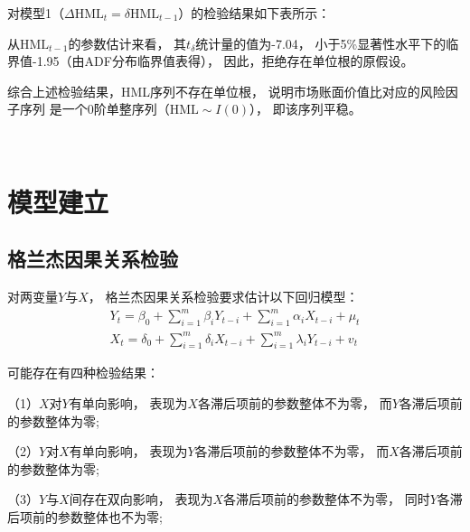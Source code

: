 \documentclass[UTF8]{ctexart}
\begin{document}
对模型1（$\Delta \text{HML}_{t} = \delta \text{HML}_{t-1}$）的检验结果如下表所示：


从$\text{HML}_{t-1}$的参数估计来看，
其$t_{\delta}$统计量的值为-7.04，
小于5\%显著性水平下的临界值-1.95（由ADF分布临界值表得），
因此，拒绝存在单位根的原假设。

综合上述检验结果，HML序列不存在单位根，
说明市场账面价值比对应的风险因子序列
是一个0阶单整序列（$\text{HML} \sim I(0)$），
即该序列平稳。

$\ $


\section{模型建立}

\subsection{格兰杰因果关系检验}

对两变量$Y$与$X$，
格兰杰因果关系检验要求估计以下回归模型：
\begin{eqnarray}
  Y_{t}=\beta_{0}+\sum_{i=1}^{m} \beta_{i} Y_{t-i}+\sum_{i=1}^{m} \alpha_{i} X_{t-i}+\mu_{t}
  \\
  X_{t}=\delta_{0}+\sum_{i=1}^{m} \delta_{i} X_{t-i}+\sum_{i=1}^{m} \lambda_{i} Y_{t-i}+v_{t}
\end{eqnarray}

可能存在有四种检验结果：

（1）$X$对$Y$有单向影响，
表现为$X$各滞后项前的参数整体不为零，
而$Y$各滞后项前的参数整体为零;

（2）$Y$对$X$有单向影响，
表现为$Y$各滞后项前的参数整体不为零，
而$X$各滞后项前的参数整体为零;

（3）$Y$与$X$间存在双向影响，
表现为$X$各滞后项前的参数整体不为零，
同时$Y$各滞后项前的参数整体也不为零;
\end{document}
